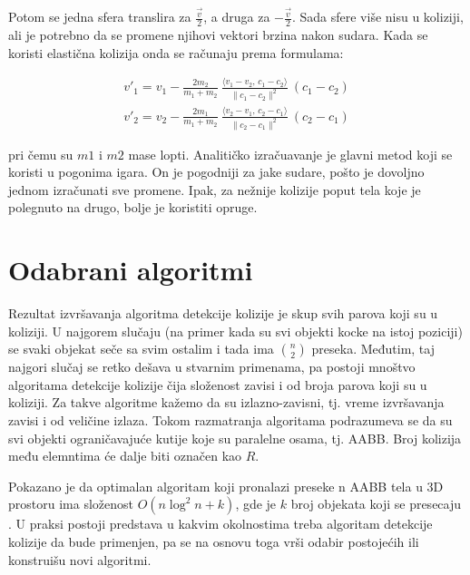 \documentclass[12pt,oneside]{memoir}
\begin{document}
Potom se jedna sfera translira za $ \frac{ \vec{v} }{ 2 }$, a druga za $ -\frac{ \vec{v} }{ 2 }$.
Sada sfere više nisu u koliziji, ali je potrebno da se promene njihovi vektori brzina nakon sudara.
Kada se koristi elastična kolizija onda se računaju prema formulama:


\begin{equation}
	\label{eq:razresenje}
	\begin{split}
		{v}'_1= {v}_1-\frac{2 m_2}{m_1+m_2} \ \frac{\langle  {v}_1- {v}_2,\, {c}_1- {c}_2\rangle}{\| {c}_1- {c}_2\|^2} \ ( {c}_1- {c}_2) \\
		{v}'_2= {v}_2-\frac{2 m_1}{m_1+m_2} \ \frac{\langle  {v}_2- {v}_1,\, {c}_2- {c}_1\rangle}{\| {c}_2- {c}_1\|^2} \ ( {c}_2- {c}_1) 
	\end{split}
\end{equation}


pri čemu su $m1$ i $m2$ mase lopti.
Analitičko izračuavanje je glavni metod koji se koristi u pogonima igara.
On je pogodniji za jake sudare, pošto je dovoljno jednom izračunati sve promene.
Ipak, za nežnije kolizije poput tela koje je polegnuto na drugo, bolje je koristiti opruge.

\chapter{Odabrani algoritmi}
\label{sec:algoritmi}

Rezultat izvršavanja algoritma detekcije kolizije je skup svih parova koji su u koliziji.
U najgorem slučaju (na primer kada su svi objekti kocke na istoj poziciji) se svaki objekat
seče sa svim ostalim i tada ima $ {n\choose 2}  $ preseka. Međutim, taj najgori slučaj se retko dešava
u stvarnim primenama, pa postoji mnoštvo algoritama detekcije kolizije čija složenost zavisi i od broja
parova koji su u koliziji. Za takve algoritme kažemo da su izlazno-zavisni, tj.
vreme izvršavanja zavisi i od veličine izlaza. Tokom razmatranja algoritama podrazumeva se da su svi
objekti ograničavajuće kutije koje su paralelne osama, tj. AABB.
Broj kolizija među elemntima će dalje biti označen kao $R$. 

Pokazano je da optimalan algoritam koji pronalazi preseke n AABB tela u 3D prostoru ima složenost 
$O(n \log^2 n + k)$, gde je $k$ broj objekata koji se presecaju \cite{glavna1}. 
U praksi postoji predstava u kakvim okolnostima treba algoritam detekcije kolizije da bude primenjen, pa 
se na osnovu toga vrši odabir postojećih ili konstruišu novi algoritmi.
\end{document}
